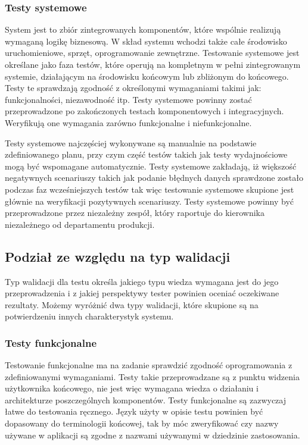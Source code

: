 \subsubsection{Testy systemowe}
System jest to zbiór zintegrowanych komponentów, które wspólnie realizują wymaganą logikę biznesową. W skład systemu wchodzi także całe środowisko uruchomieniowe, sprzęt, oprogramowanie zewnętrzne. Testowanie systemowe jest określane jako faza testów, które operują na kompletnym w pełni zintegrowanym systemie, działającym na środowisku końcowym lub zbliżonym do końcowego. Testy te sprawdzają zgodność z określonymi wymaganiami takimi jak: funkcjonalności, niezawodność itp.
Testy systemowe powinny zostać przeprowadzone po  zakończonych testach  komponentowych i integracyjnych.  Weryfikują one wymagania zarówno funkcjonalne i niefunkcjonalne.

Testy systemowe najczęściej wykonywane są manualnie na podstawie zdefiniowanego planu, przy czym część testów takich jak testy wydajnościowe mogą być wspomagane automatycznie.
Testy systemowe zakładają, iż większość negatywnych scenariuszy takich jak podanie błędnych danych sprawdzone zostało podczas faz wcześniejszych testów tak więc testowanie systemowe skupione jest głównie na weryfikacji pozytywnych scenariuszy. 
Testy systemowe powinny być przeprowadzone przez niezależny zespół, który raportuje do kierownika niezależnego od departamentu produkcji. 



\subsection{Podział ze względu na typ walidacji}
Typ walidacji dla testu określa jakiego typu wiedza wymagana jest do jego przeprowadzenia i z jakiej perspektywy tester powinien oceniać oczekiwane rezultaty. Możemy wyróżnić dwa typy walidacji, które skupione są na potwierdzeniu innych charakterystyk systemu.
\subsubsection{Testy funkcjonalne}
Testowanie funkcjonalne ma na zadanie sprawdzić zgodność oprogramowania z zdefiniowanymi wymaganiami. Testy takie przeprowadzane są z punktu widzenia użytkownika końcowego, nie jest więc wymagana wiedza o działaniu i architekturze poszczególnych komponentów. Testy funkcjonalne są  zazwyczaj łatwe do testowania ręcznego. Język użyty w opisie testu powinien być dopasowany do terminologii końcowej, tak by móc zweryfikować czy nazwy używane w aplikacji są zgodne z nazwami używanymi w dziedzinie zastosowania.

